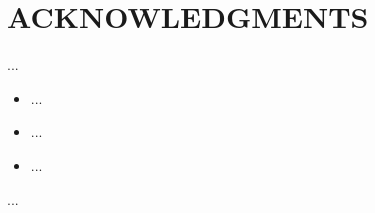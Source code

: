 
\chapter*{ACKNOWLEDGMENTS}

...

\begin{itemize}
  \item ...
  \item ...
  \item ...
\end{itemize}

...
